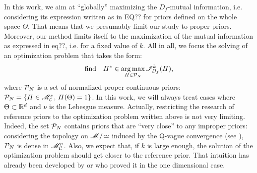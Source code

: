 In this work, we aim at ``globally'' maximizing the $D_f$-mutual information, i.e. considering its expression written as in EQ?? for priors defined on the whole space $\Theta$.
That means that we presumably limit our study to proper priors. 
Moreover, our method limits itself to the maximization of the mutual information as expressed in eq??, i.e. for a fixed value of $k$.
All in all, we focus the solving of an optimization problem that takes the form:
    \begin{equation}
        \text{find}\quad\varPi^\ast\in\operatorname*{arg\,max}_{\varPi\in\mathcal{P}_N} \mathscr{I}^k_{D_f}(\varPi),
    \end{equation}
where $\mathcal{P}_N$ is a set of normalized proper continuous priors: $\mathcal{P}_N=\{\varPi\in\mathscr{M}^\nu_{\mathcal{C}},\,\varPi(\Theta)=1 \}$. In this work, we will always treat cases where $\Theta\subset\mathbb{R}^d$ and $\nu$ is the Lebesgue measure.
Actually, restricting the research of reference priors to the optimization problem written above is not very limiting. Indeed, the set $\mathcal{P}_N$ contains priors that are ``very close'' to any improper priors: considering the topology on $\mathscr{M}/\!\simeq$ induced by the Q-vague convergence (see \cite{bioche_approximation_2016}), $\mathcal{P}_N$ is dense in $\mathscr{M}^\nu_{\mathcal{C}}$.
Also, we expect that, if $k$ is large enough, the solution of the optimization problem should get closer to the reference prior. That intuition has already been developed by \citet{berger_formal_2009} or \cite{le_formal_2014} who proved it in the one dimensional case.






